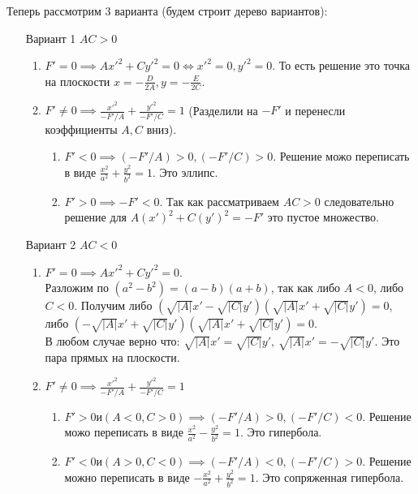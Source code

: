 \documentclass[a4paper,12pt]{article}
\begin{document}
Теперь рассмотрим 3 варианта (будем строит дерево вариантов):
\begin{enumerate}
\item[Вариант 1] $AC > 0$
\begin{enumerate}
\item  $ F' = 0 \implies Ax'^2 + Cy'^2 = 0 \iff x'^2 = 0, y'^2 = 0$. То есть решение это точка на 
плоскости $x = - \frac{D}{2A}, y = - \frac{E}{2C}$.

\item $ F' \neq 0 \implies \frac{x'^2}{-F' / A} +  \frac{y'^2}{-F' / C} = 1$ (Разделили на $ - F'$ и перенесли коэффициенты $A, C$ вниз). 
\begin{enumerate}
\item $ F' < 0 \implies  (-F' / A) > 0 , (-F' / C)  > 0 $. 
Решение можо переписать в виде $ \frac{x^2}{a^2} + \frac{y^2}{b^2} = 1 $. Это эллипс.
\item $ F' > 0 \implies -F' < 0 $. Так как рассматриваем 
$ AC > 0 $ следовательно решение для $ A(x')^2 + C(y')^2 = - F' $ это пустое множество. 
\end{enumerate}

\end{enumerate}

\bigskip
\item[Вариант 2] $AC < 0$
\begin{enumerate}
\item  $ F' = 0 \implies Ax'^2 + Cy'^2 = 0 $.  \\
Разложим по $ ( a^2 - b^2 ) = (a - b)(a + b) $, так как либо $A < 0$,  либо $ C < 0 $.
Получим либо $ (\sqrt{|A|}x' - \sqrt{|C|}y')(\sqrt{|A|}x' + \sqrt{|C|}y') = 0 $, \\
либо $ (- \sqrt{|A|}x' + \sqrt{|C|}y')(\sqrt{|A|}x' + \sqrt{|C|}y') = 0 $. \\
В любом случае верно что:
$ \sqrt{|A|}x' = \sqrt{|C|}y', \, \sqrt{|A|}x' = - \sqrt{|C|}y' $.
 Это пара прямых на плоскости.

\item $ F' \neq 0 \implies \frac{x'^2}{-F' / A} +  \frac{y'^2}{-F' / C} = 1$ 
\begin{enumerate}
\item $  F' > 0 и (A < 0, C > 0) \implies  (-F' / A) > 0,  (-F' / C)  < 0 $. 
Решение можо переписать в виде $ \frac{x^2}{a^2} - \frac{y^2}{b^2} = 1 $. 
Это гипербола.
\item $ F' < 0 и (A > 0, C < 0) \implies   (-F' / A) < 0,  (-F' / C)  > 0 $. 
Решение можно переписать в виде $ - \frac{x^2}{a^2} + \frac{y^2}{b^2} = 1 $. 
Это сопряженная гипербола.
\end{enumerate}


\end{enumerate}
\end{enumerate}
\end{document}
